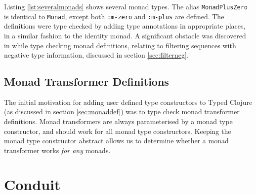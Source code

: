 Listing \ref{lst:severalmonads} shows several monad types. The alias \lstinline|MonadPlusZero|
is identical to \lstinline|Monad|, except both \lstinline|:m-zero| and \lstinline|:m-plus| are defined.
The definitions were type checked by adding type annotations in appropriate places, in a similar fashion
to the identity monad. A significant obstacle was discovered in while type checking monad definitions,
relating to filtering sequences with negative type information, discussed in section \ref{sec:filterneg}.

\subsection{Monad Transformer Definitions}

The initial motivation for adding user defined type constructors to Typed Clojure
(as discussed in section \ref{sec:monaddef}) was to type check
monad transformer definitions.
Monad transformers are always parameterised by a monad type constructor, and should work for all
monad type constructors. Keeping the monad type constructor abstract allows us to determine
whether a monad transformer works \emph{for any} monads.


\section{Conduit}
